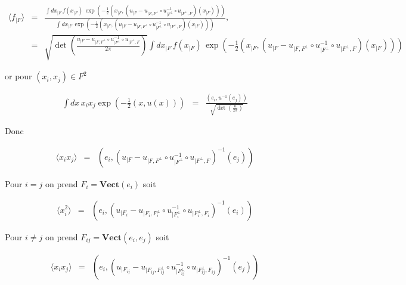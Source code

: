 \begin{eqnarray*}
	\langle f_{\vert F } \rangle  & = & \frac{\int d x_{\vert F}  \, f(x_{\vert F}) \, \exp \left ( - \frac{1}{2} \left ( x_{\vert F } , \left ( u_{\vert F }- u_{\vert F, F^\perp} \circ u_{\vert F^\perp}^{-1} \circ u_{\vert F^\perp, F} \right ) \left (x_{\vert F } \right ) \right ) \right ) }{\int d x_{\vert F}   \, \exp \left ( - \frac{1}{2} \left ( x_{\vert F } , \left ( u_{\vert F }- u_{\vert F, F^\perp} \circ u_{\vert F^\perp}^{-1} \circ u_{\vert F^\perp, F} \right ) \left (x_{\vert F } \right ) \right ) \right )},\\
	& = & \sqrt{ \det \left( \frac{u_{\vert F }- u_{\vert F, F^\perp} \circ u_{\vert F^\perp}^{-1} \circ u_{\vert F^\perp, F}}{2\pi} \right)}\int d x_{\vert F}  \, f(x_{\vert F}) \, \exp \left ( - \frac{1}{2} \left ( x_{\vert F } , \left ( u_{\vert F }- u_{\vert F, F^\perp} \circ u_{\vert F^\perp}^{-1} \circ u_{\vert F^\perp, F} \right ) \left (x_{\vert F } \right ) \right ) \right )
\end{eqnarray*}

or pour $(x_i , x_j)\in F^2$ 	

\begin{eqnarray*}
	\int d x  \, x_i x_j \exp \left ( - \frac{1}{2} ( x , u(x)) \right ) & = &  \frac{( e_i , u^{-1}(e_j))}{\sqrt{\det \left (\frac{u}{2\pi}\right ) }} 	
\end{eqnarray*}

Donc 

\begin{eqnarray*}
	\langle x_i x_j \rangle  & = & \left ( e_i , \left ( u_{\vert F }- u_{\vert F, F^\perp} \circ u_{\vert F^\perp}^{-1} \circ u_{\vert F^\perp, F} \right )^{-1} \left (e_j\right ) \right ) 
\end{eqnarray*}

Pour $i = j$ on prend $F_i = \mathbf{Vect} ( e_i) $ soit 

\begin{eqnarray*}
	\langle x_i^2 \rangle  & = & \left ( e_i , \left ( u_{\vert F_i }- u_{\vert F_i, F_i^\perp} \circ u_{\vert F_i^\perp}^{-1} \circ u_{\vert F_i^\perp, F_i} \right )^{-1} \left (e_i\right ) \right ) 
\end{eqnarray*}

Pour $i \neq j$ on prend $F_{ij} = \mathbf{Vect} ( e_i , e_j) $ soit 

\begin{eqnarray*}
	\langle x_i x_j \rangle  & = & \left ( e_i , \left ( u_{\vert F_{ij} }- u_{\vert F_{ij}, F_{ij}^\perp} \circ u_{\vert F_{ij}^\perp}^{-1} \circ u_{\vert F_{ij}^\perp, F_{ij}} \right )^{-1} \left (e_j\right ) \right ) 
\end{eqnarray*}


